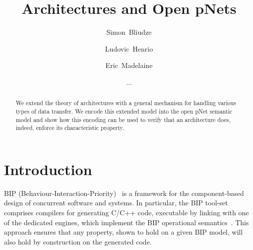 \documentclass{llncs}
\begin{document}
\graphicspath{{figures/}}

\title{Architectures and Open pNets}

\author{%
Simon~Bliudze
\and
Ludovic~Henrio
\and
Eric~Madelaine
\and
...
}



\maketitle

\begin{abstract}
  We extend the theory of architectures with a general
  mechanism for handling various types of data transfer.  We
  encode this extended model into the open pNet semantic
  model and show how this encoding can be used to verify
  that an architecture does, indeed, enforce its
  characteristic property.

\keywords{}
\end{abstract}


\section{Introduction}
\label{secn:introduction}

BIP (Behaviour-Interaction-Priority)~\cite{bip} is a framework for the
component-based design of concurrent software and systems.  In
particular, the BIP tool-set comprises compilers for generating C/C++
code, executable by linking with one of the dedicated engines, which
implement the BIP operational semantics~\cite{BliSif08-acp-tc}.
This approach ensures that any property, shown to hold on a given BIP
model, will also hold by construction on the generated code.
\end{document}
